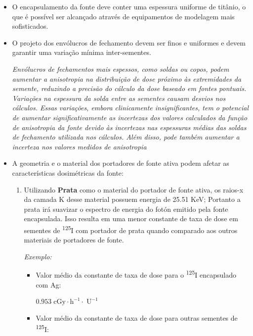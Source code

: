 \documentclass[11pt,a4paper]{article}
\begin{document}
				\begin{itemize}[label=\textcolor{CarnationPink}{$\blacktriangleright$}]
					\item O encapsulamento da fonte deve conter uma espessura uniforme de titânio, o que é possível ser alcançado através de equipamentos de modelagem mais sofisticados.
					
					\item O projeto dos envólucros de fechamento devem ser finos e uniformes e devem garantir uma variação mínima inter-sementes. 

						\textit{Envólucros de fechamentos mais espessos, como soldas ou copos, podem aumentar a anisotropia na distribuição de dose próximo às extremidades da semente, reduzindo a precisão do cálculo da dose baseado em fontes pontuais. Variações na espessura da solda entre as sementes causam desvios nos cálculos. Essas variações, embora clinicamente insignificantes, tem o potencial de aumentar significativamente as incertezas dos valores calculados da função de anisotropia da fonte devido às incertezas nas espessuras médias das soldas de fechamento utilizada nos cálculos. Além disso, pode também aumentar a incerteza nos valores medidos de anisotropia}
					
					\item A geometria e o material dos portadores de fonte ativa podem afetar as características dosimétricas da fonte:
					
						\begin{enumerate}
							\item Utilizando \textbf{Prata} como o material do portador de fonte ativa, os raios-x da camada K desse material possuem energia de 25.51 KeV; Portanto a prata irá suavizar o espectro de energia do fotón emitido pela fonte encapsulada. Isso resulta em uma menor constante de taxa de dose em sementes de \textsuperscript{125}I com portador de prata quando comparado aos outros materiais de portadores de fonte.
							
								\textit{\textcolor{CarnationPink}{Exemplo:}} 
									\begin{itemize}
										\item Valor médio da constante de taxa de dose para o \textsuperscript{125}I encapsulado com Ag:
										
											\textbf{$\mathrm{0.953 \; cGy \cdot h^{-1} \cdot \; U^{-1}}$}
										\item Valor médio da constante de taxa de dose para outras sementes de \textsuperscript{125}I:
										

\end{itemize}
\end{enumerate}
\end{itemize}
\end{document}
